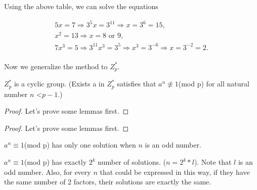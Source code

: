 \documentclass{article}
\begin{document}
\begin{example}
Using the above table, we can solve the equations
\end{example}
\begin{gather}
5x=7 \Rightarrow 3^5x=3^{11} \Rightarrow x=3^6=15,  \\
x^2=13 \Rightarrow x = 8 \text{ or } 9, \\ 
7x^3=5 \Rightarrow 3^{11}x^3=3^5 \Rightarrow x^3 = 3^{-6} \Rightarrow x = 3^{-2} = 2. \\
\end{gather}

Now we generalize the method to $Z^*_p.$

 \begin{theorem}
$Z^*_p$ is a cyclic group. 
(Exists a in $Z^*_p$ satisfies that $a^n \not \equiv 1$(mod p) for all natural number $n$ \textless $p-1$.)
\end{theorem}

\begin{proof}
Let's prove some lemmas first.
 \end{proof}

\begin{proof}
Let's prove some lemmas first.
 \end{proof}
 
  \begin{lemma}
 $a^n  \equiv 1$(mod p) has only one solution when $n$ is an odd number. 
\end{lemma}

\begin{lemma}
 $a^n  \equiv 1$(mod p) has exactly $2^k$ number of solutions. ($n = 2^k *l$). Note that $l$ is an odd number. Also, for every $n$ that could be expressed in this way, if they have the same number
 of 2 factors, their solutions are exactly the same. 
 \end{lemma}
\end{document}
